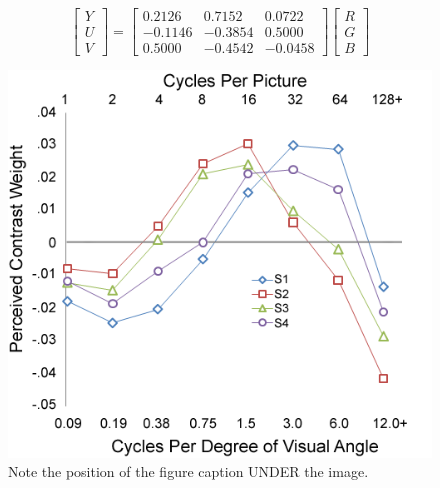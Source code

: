 \documentclass[9pt]{extarticle}
\begin{document}
\begin{multicols}{2}
\begin{equation}
    \label{eqn:matrix}
    \begin{bmatrix} Y \\ U \\ V \end{bmatrix}
    =
    \begin{bmatrix}
        0.2126 & 0.7152 & 0.0722 \\
        -0.1146 & -0.3854 & 0.5000 \\
        0.5000 & -0.4542 & -0.0458
    \end{bmatrix}
    \begin{bmatrix} R \\ G \\ B \end{bmatrix}
\end{equation}

\begin{figure}[H]
    \centering
    \includegraphics[width=\linewidth]{cycles}
    \caption{Note the position of the figure caption UNDER the image.}
    \label{fig:cycles}
\end{figure}


\end{multicols}
\end{document}
